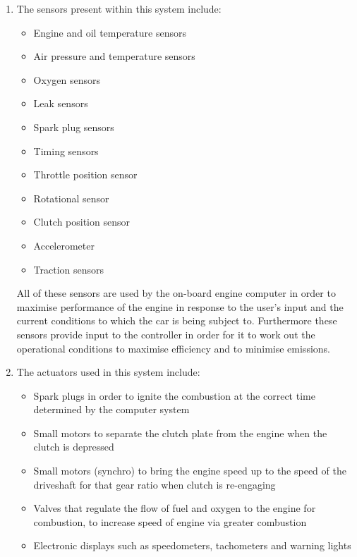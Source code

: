 \documentclass[a4paper]{article}
\begin{document}
\begin{enumerate}[label=(\alph*)]
\item The sensors present within this system include:
	\begin{itemize}
	\item Engine and oil temperature sensors
	\item Air pressure and temperature sensors
	\item Oxygen sensors 
	\item Leak sensors 
	\item Spark plug sensors 
	\item Timing sensors 
	\item Throttle position sensor 
	\item Rotational sensor
	\item Clutch position sensor 
	\item Accelerometer
	\item Traction sensors 
	\end{itemize}

All of these sensors are used by the on-board engine computer in order to maximise performance of the engine in response to the user’s input and the current conditions to which the car is being subject to. Furthermore these sensors provide input to the controller in order for it to work out the operational conditions to maximise efficiency and to minimise emissions.

\item The actuators used in this system include:
	\begin{itemize}
	\item Spark plugs in order to ignite the combustion at the correct time determined by the computer system
	\item Small motors to separate the clutch plate from the engine when the clutch is depressed
	\item Small motors (synchro) to bring the engine speed up to the speed of the driveshaft for that gear ratio when clutch is re-engaging 
	\item Valves that regulate the flow of fuel and oxygen to the engine for combustion, to increase speed of engine via greater combustion
	\item Electronic displays such as speedometers, tachometers and warning lights 
	\end{itemize}


\end{enumerate}
\end{document}
